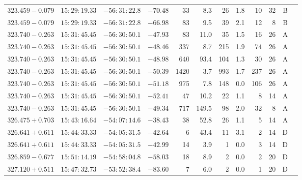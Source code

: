 {\begin{longtable}{c rrr rrrrr rr c}
    $323.459-0.079$     &   $15:29:19.33$     &   $-56:31:22.8$     &   $-70.48  $    &   33     &    8.3    &    26  &   1.8 &   10  &   32  &   B   \\
    $323.459-0.079$     &   $15:29:19.33$     &   $-56:31:22.8$     &   $-66.98  $    &   83     &    9.5    &    39  &   2.1 &   12  &   8   &   B   \\
    $323.740-0.263$     &   $15:31:45.45$     &   $-56:30:50.1$     &   $-47.93  $    &   83     &   11.0    &    35  &   1.5 &   16  &   26  &   A   \\
    $323.740-0.263$     &   $15:31:45.45$     &   $-56:30:50.1$     &   $-48.46  $    &   337    &    8.7    &    215 &   1.9 &   74  &   26  &   A   \\
    $323.740-0.263$     &   $15:31:45.45$     &   $-56:30:50.1$     &   $-48.98  $    &   640    &   93.4    &    104 &   1.3 &   30  &   26  &   A   \\
    $323.740-0.263$     &   $15:31:45.45$     &   $-56:30:50.1$     &   $-50.39  $    &   1420   &    3.7    &    993 &   1.7 &   237 &   26  &   A   \\
    $323.740-0.263$     &   $15:31:45.45$     &   $-56:30:50.1$     &   $-51.18  $    &   975    &    7.8    &    148 &   0.0 &   106 &   26  &   A   \\
    $323.740-0.263$     &   $15:31:45.45$     &   $-56:30:50.1$     &   $-52.41  $    &   47     &   10.2    &    22  &   1.1 &   8   &   14  &   A   \\
    $323.740-0.263$     &   $15:31:45.45$     &   $-56:30:50.1$     &   $-49.34  $    &   717    &  149.5    &    98  &   2.0 &   32  &   8   &   A   \\
    $326.475+0.703$     &   $15:43:16.64$     &   $-54:07:14.6$     &   $-38.43  $    &   38     &   52.8    &    26  &   1.1 &   5   &   14  &   A   \\
    $326.641+0.611$     &   $15:44:33.33$     &   $-54:05:31.5$     &   $-42.64  $    &   6      &   43.4    &    11  &   3.1 &   2   &   14  &   D   \\
    $326.641+0.611$     &   $15:44:33.33$     &   $-54:05:31.5$     &   $-42.99  $    &   14     &    3.9    &    1   &   0.0 &   3   &   14  &   D   \\
    $326.859-0.677$     &   $15:51:14.19$     &   $-54:58:04.8$     &   $-58.03  $    &   18     &    8.9    &    2   &   0.0 &   2   &   20  &   D   \\
    $327.120+0.511$     &   $15:47:32.73$     &   $-53:52:38.4$     &   $-83.60  $    &   7      &    6.0    &    2   &   0.0 &   1   &   20  &   D   \\

\end{longtable}}
